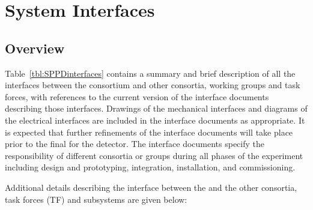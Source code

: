 \section{System Interfaces}
\label{sec:fdsp-pd-intfc}


\subsection{Overview}
Table~\ref{tbl:SPPDinterfaces} contains a summary and brief description of all the interfaces between the   consortium and other consortia, working groups and task forces, with references to the current version of the interface documents describing those interfaces.  
Drawings of the mechanical interfaces and diagrams of the electrical interfaces are 
included in the interface documents as appropriate.
It is expected that further refinements of the interface documents will take place prior to the final  for the detector. The interface documents specify the responsibility of different consortia or groups during all phases of the experiment including design and prototyping, integration,  installation, and  commissioning.



Additional details describing the interface between the   and the other consortia, task forces (TF) and subsystems are given below:



